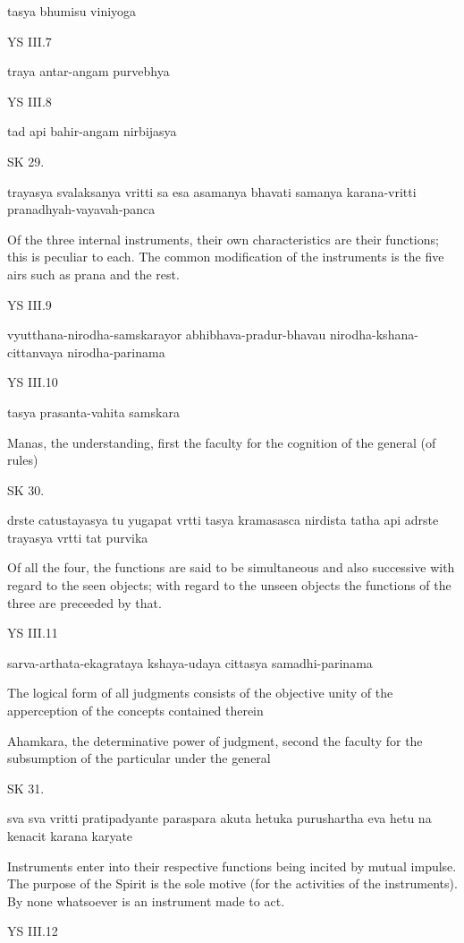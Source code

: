     tasya bhumisu viniyoga

YS III.7

    traya antar-angam purvebhya

YS III.8

    tad api bahir-angam nirbijasya

SK 29.

trayasya svalaksanya vritti sa esa asamanya bhavati
samanya karana-vritti pranadhyah-vayavah-panca

Of the three internal instruments,
their own characteristics are their functions;
this is peculiar to each.
The common modification of the instruments is the five airs
such as prana and the rest.

YS III.9

    vyutthana-nirodha-samskarayor abhibhava-pradur-bhavau
    nirodha-kshana-cittanvaya nirodha-parinama

YS III.10

    tasya prasanta-vahita samskara

    Manas, the understanding, first the faculty
    for the cognition of the general (of rules)

SK 30.

drste catustayasya tu yugapat vrtti tasya kramasasca nirdista
tatha api adrste trayasya vrtti tat purvika

Of all the four, the functions are said to be
simultaneous and also successive
with regard to the seen objects;
with regard to the unseen objects
the functions of the three are preceeded by that.

YS III.11

    sarva-arthata-ekagrataya kshaya-udaya cittasya samadhi-parinama

    The logical form of all judgments consists of the objective unity of
    the apperception of the concepts contained therein

    Ahamkara, the determinative power of judgment,
    second the faculty for the subsumption of
    the particular under the general

SK 31.

sva sva vritti pratipadyante paraspara akuta hetuka
purushartha eva hetu na kenacit karana karyate

Instruments enter into their respective functions
being incited by mutual impulse.
The purpose of the Spirit is the sole motive
(for the activities of the instruments).
By none whatsoever is an instrument made to act.

YS III.12

